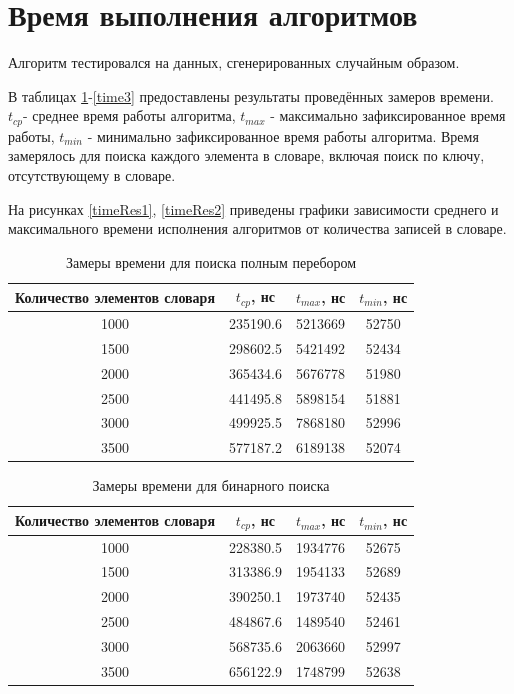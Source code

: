 \documentclass[12pt]{report}
\begin{document}
\newpage
\section{Время выполнения алгоритмов}
Алгоритм тестировался на данных, сгенерированных случайным образом.

В таблицах \ref{time1}-\ref{time3} предоставлены результаты проведённых замеров времени. $t_{cp}$- среднее время работы алгоритма, $t_{max}$ - максимально зафиксированное время работы, $t_{min}$ - минимально зафиксированное время работы алгоритма. Время замерялось для поиска каждого элемента в словаре, включая поиск по ключу, отсутствующему в словаре.

На рисунках \ref{timeRes1}, \ref{timeRes2} приведены графики зависимости среднего и максимального времени исполнения алгоритмов от количества записей в словаре.

\begin{table}[h]
	\begin{center}
		\caption{\label{time1} Замеры времени для поиска полным перебором}
		\begin{tabular}{|c | c | c | c|} 
 			\hline
			Количество элементов словаря & $t_{cp}$, нс & $t_{max}$, нс & $t_{min}$, нс\\ [0.5ex] 
 			\hline\hline
 			1000 & 235190.6 & 5213669 & 52750\\
 			\hline
 			1500 & 298602.5 & 5421492 & 52434\\
 			\hline
 			2000 & 365434.6 & 5676778 & 51980\\
 			\hline
 			2500 & 441495.8 & 5898154 & 51881\\
 			\hline
 			3000 & 499925.5 & 7868180 & 52996\\
 			\hline
 			3500 & 577187.2 & 6189138 & 52074\\
 			\hline
			\end{tabular}
	\end{center}
\end{table}

\begin{table}[h]
	\begin{center}
		\caption{\label{time2} Замеры времени для бинарного поиска}
		\begin{tabular}{|c | c | c | c|} 
 			\hline
			Количество элементов словаря & $t_{cp}$, нс & $t_{max}$, нс & $t_{min}$, нс\\ [0.5ex] 
 			\hline\hline
 			1000 & 228380.5 & 1934776 & 52675\\
 			\hline
 			1500 & 313386.9 & 1954133 & 52689\\
 			\hline
 			2000 & 390250.1 & 1973740 & 52435\\
 			\hline
 			2500 & 484867.6 & 1489540 & 52461\\
 			\hline
 			3000 & 568735.6 & 2063660 & 52997\\
 			\hline
 			3500 & 656122.9 & 1748799 & 52638\\
 			\hline
			\end{tabular}
	\end{center}
\end{table}
\end{document}
